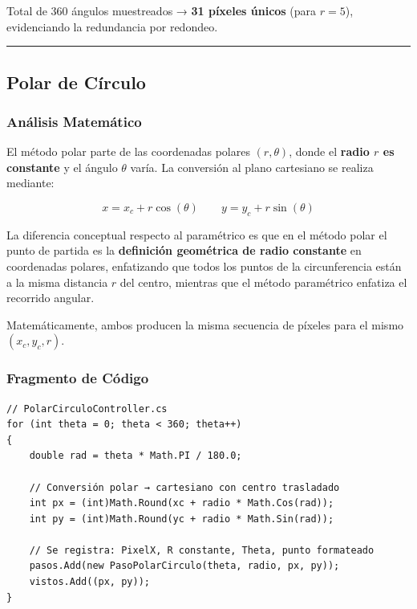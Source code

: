 \documentclass[
  spanish,
  a4paper,
  12pt,
]{article}
\begin{document}
Total de 360 ángulos muestreados → \textbf{31 píxeles únicos} (para
\(r=5\)), evidenciando la redundancia por redondeo.

\begin{center}\rule{0.5\linewidth}{0.5pt}\end{center}

\subsection{Polar de Círculo}\label{polar-de-cuxedrculo}

\subsubsection{Análisis
Matemático}\label{anuxe1lisis-matemuxe1tico-5}

El método polar parte de las coordenadas polares \((r, \theta)\), donde
el \textbf{radio \(r\) es constante} y el ángulo \(\theta\) varía. La
conversión al plano cartesiano se realiza mediante:

\[x = x_c + r\cos(\theta) \qquad y = y_c + r\sin(\theta)\]

La diferencia conceptual respecto al paramétrico es que en el método
polar el punto de partida es la \textbf{definición geométrica de radio
constante} en coordenadas polares, enfatizando que todos los puntos de
la circunferencia están a la misma distancia \(r\) del centro, mientras
que el método paramétrico enfatiza el recorrido angular.

Matemáticamente, ambos producen la misma secuencia de píxeles para el
mismo \((x_c, y_c, r)\).

\newpage

\subsubsection{Fragmento de Código}\label{fragmento-de-cuxf3digo-5}

\begin{lstlisting}
// PolarCirculoController.cs
for (int theta = 0; theta < 360; theta++)
{
    double rad = theta * Math.PI / 180.0;

    // Conversión polar → cartesiano con centro trasladado
    int px = (int)Math.Round(xc + radio * Math.Cos(rad));
    int py = (int)Math.Round(yc + radio * Math.Sin(rad));

    // Se registra: PixelX, R constante, Theta, punto formateado
    pasos.Add(new PasoPolarCirculo(theta, radio, px, py));
    vistos.Add((px, py));
}
\end{lstlisting}
\end{document}
